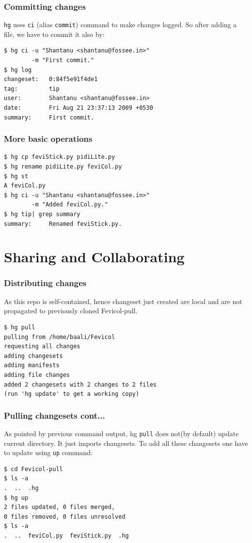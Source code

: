 \documentclass[14pt,compress]{beamer}
\newcounter{time}
\newcommand{\inctime}[1]{\addtocounter{time}{#1}{\tiny \thetime\ m}}
\newcommand{\typ}[1]{\lstinline{#1}}
\begin{document}
\begin{frame}[fragile]
  \frametitle{Committing changes}
  \typ{hg} uses \typ{ci} (alias \typ{commit}) command to make changes logged. So after adding a file, we have to commit it also by:
  \begin{lstlisting}
$ hg ci -u "Shantanu <shantanu@fossee.in>" 
        -m "First commit."
$ hg log
changeset:   0:84f5e91f4de1
tag:         tip
user:        Shantanu <shantanu@fossee.in>
date:        Fri Aug 21 23:37:13 2009 +0530
summary:     First commit.    
  \end{lstlisting}
\end{frame}

\begin{frame}[fragile]
  \frametitle{More basic operations}
  \begin{lstlisting}
$ hg cp feviStick.py pidiLite.py
$ hg rename pidiLite.py feviCol.py
$ hg st
A feviCol.py
$ hg ci -u "Shantanu <shantanu@fossee.in>" 
        -m "Added feviCol.py."
$ hg tip| grep summary 
summary:     Renamed feviStick.py.
  \end{lstlisting} %
  \inctime{10}
\end{frame}

\section{Sharing and Collaborating}

\begin{frame}[fragile]
  \frametitle{Distributing changes}
  As this repo is self-contained, hence changeset just created are local and are not propagated to previously cloned Fevicol-pull.
  \begin{lstlisting}
$ hg pull 
pulling from /home/baali/Fevicol
requesting all changes
adding changesets
adding manifests
adding file changes
added 2 changesets with 2 changes to 2 files
(run 'hg update' to get a working copy)
  \end{lstlisting} %
\end{frame}

\begin{frame}[fragile]
  \frametitle{Pulling changesets cont...}
  As pointed by previous command output, hg \typ{pull} does not(by default) update current directory. It just imports changesets. To add all these changesets one have to update using \typ{up} command:
  \begin{lstlisting}
$ cd Fevicol-pull
$ ls -a
.  ..  .hg
$ hg up
2 files updated, 0 files merged, 
0 files removed, 0 files unresolved
$ ls -a
.  ..  feviCol.py  feviStick.py  .hg    
  \end{lstlisting}
\end{frame}
\end{document}
